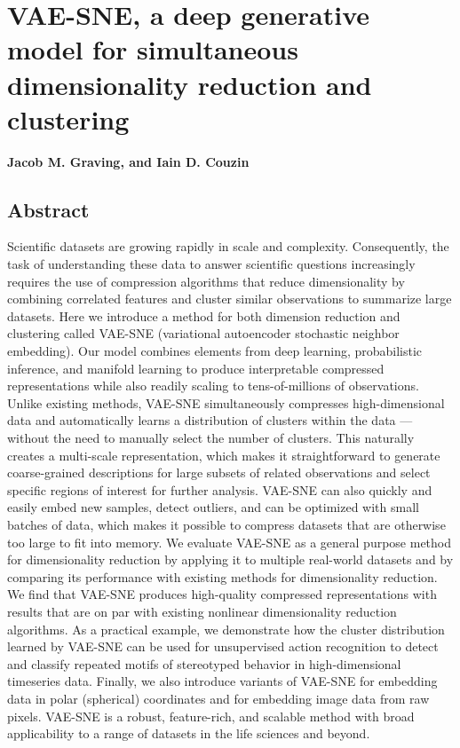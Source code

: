 \documentclass[11pt,a4paper,oneside]{book}
\begin{document}
\newpage 
	\chapter[VAE-SNE, a deep generative model]{VAE-SNE, a deep generative model for simultaneous dimensionality reduction and clustering}
	\vspace{5mm}
	\textbf{Jacob M. Graving, and Iain D. Couzin} \\

	\section{Abstract}

Scientific datasets are growing rapidly in scale and complexity. Consequently, the task of understanding these data to answer scientific questions increasingly requires the use of compression algorithms that
reduce dimensionality by combining correlated features and cluster similar observations to summarize
large datasets. Here we introduce a method for both dimension reduction and clustering called
VAE-SNE (variational autoencoder stochastic neighbor embedding). Our model combines elements from
deep learning, probabilistic inference, and manifold learning to produce interpretable compressed
representations while also readily scaling to tens-of-millions of observations. Unlike existing methods,
VAE-SNE simultaneously compresses high-dimensional data and automatically learns a distribution of
clusters within the data — without the need to manually select the number of clusters. This naturally
creates a multi-scale representation, which makes it straightforward to generate coarse-grained
descriptions for large subsets of related observations and select specific regions of interest for further
analysis. VAE-SNE can also quickly and easily embed new samples, detect outliers, and can be optimized
with small batches of data, which makes it possible to compress datasets that are otherwise too large to
fit into memory. We evaluate VAE-SNE as a general purpose method for dimensionality reduction by
applying it to multiple real-world datasets and by comparing its performance with existing methods for
dimensionality reduction. We find that VAE-SNE produces high-quality compressed representations with
results that are on par with existing nonlinear dimensionality reduction algorithms. As a practical
example, we demonstrate how the cluster distribution learned by VAE-SNE can be used for unsupervised
action recognition to detect and classify repeated motifs of stereotyped behavior in high-dimensional
timeseries data. Finally, we also introduce variants of VAE-SNE for embedding data in polar (spherical)
coordinates and for embedding image data from raw pixels. VAE-SNE is a robust, feature-rich, and
scalable method with broad applicability to a range of datasets in the life sciences and beyond.
\end{document}
